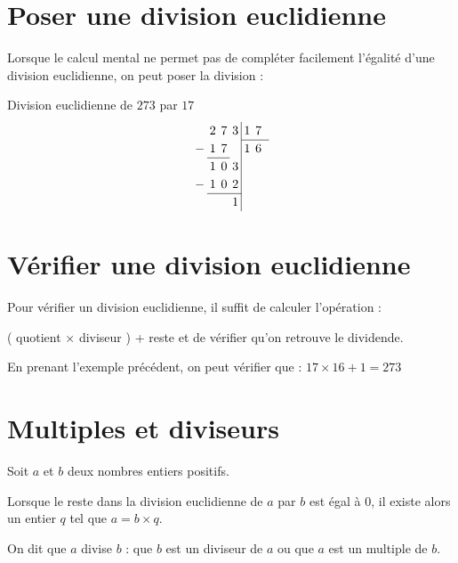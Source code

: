 \documentclass[a4paper,dvipsnames]{article}
\begin{document}
\section{Poser une division euclidienne}

Lorsque le calcul mental ne permet pas de compléter facilement l'égalité d'une division euclidienne, on peut poser la division :

\begin{Ex}
Division euclidienne de $273$ par $17$
\begin{equation*}
\renewcommand{\arraystretch}{1.2}
\renewcommand{\arraycolsep}{2pt}
  \begin{array}{rrrr|rrr}
 & 2 & 7 & 3 & 1 & 7 \\
\cline{5-7}
 -& 1 & 7 &  & 1 & 6\\
\cline{2-3}
    &1 & 0 & 3 &   &   &  \\
    -& 1 & 0 & 2 &   &   &  \\
    \cline{2-4}
    &&  & 1 &   &   &  \\
  \end{array}
\end{equation*}
\end{Ex} 

\section{Vérifier une division euclidienne}

\begin{Mt}
Pour vérifier un division euclidienne, il suffit de calculer l'opération :

( quotient × diviseur ) + reste et de vérifier qu'on retrouve le dividende.

\begin{Ex}
En prenant l'exemple précédent, on peut vérifier que : $17\times16+1=273$
\end{Ex}
\end{Mt}

\section{Multiples et diviseurs}

\begin{Def}
Soit $a$ et $b$ deux nombres entiers positifs.

Lorsque le reste dans la division euclidienne de $a$ par $b$ est égal à $0$, il existe alors un entier $q$ tel que $a=b\times q$.

On dit que $a$ divise $b$ : que $b$ est un diviseur de $a$ ou que $a$ est un multiple de $b$.
\end{Def}
\end{document}
